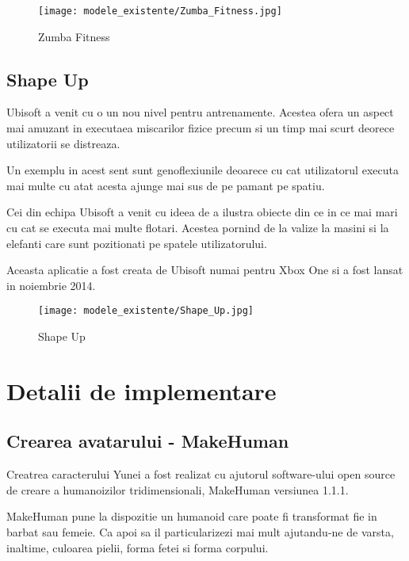 \documentclass[12pt,a4paper]{report}
\begin{document}
\begin{figure}[th]
\centering
\texttt{[image: modele\_existente/Zumba\_Fitness.jpg]} 
  \caption[Zumba Fitness]{Zumba Fitness\protect\footnotemark}
  \label{figure_1:picture_8}
\end{figure}

\section{Shape Up}

Ubisoft a venit cu o un nou nivel pentru antrenamente. Acestea ofera un aspect mai amuzant in executaea miscarilor fizice precum si un timp mai scurt deorece utilizatorii se distreaza.

Un exemplu in acest sent sunt genoflexiunile deoarece cu cat utilizatorul executa mai multe cu atat acesta ajunge mai sus de pe pamant pe spatiu.

Cei din echipa Ubisoft a venit cu ideea de a ilustra obiecte din ce in ce mai mari cu cat se executa mai multe flotari. Acestea pornind de la valize la masini si la elefanti care sunt pozitionati pe spatele utilizatorului.

Aceasta aplicatie a fost creata de Ubisoft numai pentru Xbox One si a fost lansat in noiembrie 2014.

\begin{figure}[th]
\centering
\texttt{[image: modele\_existente/Shape\_Up.jpg]}
  \caption[Shape Up]{Shape Up\protect\footnotemark}
  \label{figure_1:picture_9}
\end{figure}


\chapter{Detalii de implementare}

\section{Crearea avatarului - MakeHuman}

Creatrea caracterului Yunei a fost realizat cu ajutorul software-ului open source de creare a humanoizilor tridimensionali, MakeHuman versiunea 1.1.1.

MakeHuman pune la dispozitie un humanoid care poate fi transformat fie in barbat sau femeie. Ca apoi sa il particularizezi mai mult ajutandu-ne de varsta, inaltime, culoarea pielii, forma fetei si forma corpului.
\end{document}
